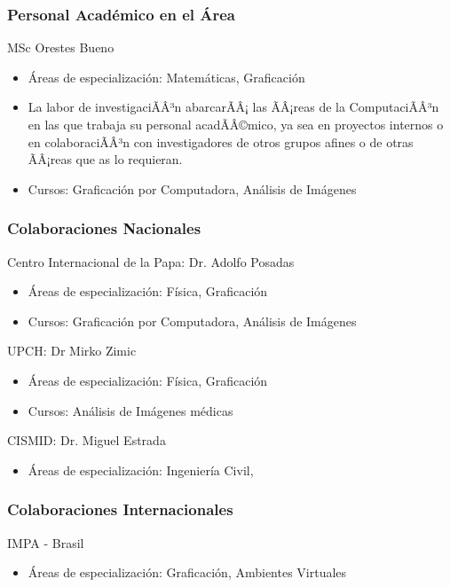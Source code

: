\subsubsection{Personal Acad\'emico en el \'Area}

MSc Orestes Bueno
\begin{itemize}
\item \'Areas de especializaci\'on: Matem\'aticas, Graficaci\'on \item La labor de investigaciÃÂ³n abarcarÃÂ¡ las ÃÂ¡reas de la ComputaciÃÂ³n en las que trabaja su personal acadÃÂ©mico, ya sea en proyectos internos o en colaboraciÃÂ³n con investigadores de otros grupos afines o de otras ÃÂ¡reas que as  lo requieran.

\item Cursos: Graficaci\'on por Computadora, An\'alisis de Im\'agenes
\end{itemize}

\subsubsection{Colaboraciones Nacionales}

Centro Internacional de la Papa: Dr. Adolfo Posadas
\begin{itemize}
\item \'Areas de especializaci\'on: F\'isica, Graficaci\'on 
\item Cursos: Graficaci\'on por Computadora, An\'alisis de Im\'agenes
\end{itemize}

UPCH: Dr Mirko Zimic
\begin{itemize}
\item \'Areas de especializaci\'on: F\'isica, Graficaci\'on 
\item Cursos: An\'alisis de Im\'agenes m\'edicas
\end{itemize}

CISMID: Dr. Miguel Estrada
\begin{itemize}
\item \'Areas de especializaci\'on: Ingenier\'ia Civil, 
\end{itemize}

\subsubsection{Colaboraciones Internacionales}

IMPA - Brasil
\begin{itemize}
\item \'Areas de especializaci\'on: Graficaci\'on, Ambientes Virtuales
\end{itemize}


